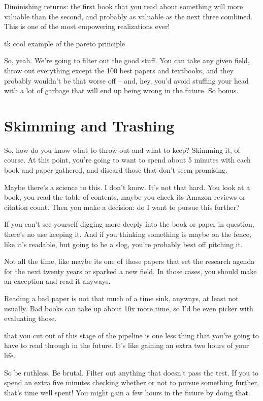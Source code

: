 Diminishing returns: the first book that you read about something will more
valuable than the second, and probably as valuable as the next three
combined. This is one of the most empowering realizations ever!

tk cool example of the pareto principle

So, yeah. We're going to filter out the good stuff. You can take any given
field, throw out everything except the 100 best papers and textbooks, and they
probably wouldn't be that worse off -- and, hey, you'd avoid stuffing your head
with a lot of garbage that will end up being wrong in the future. So bonus.

\section{Skimming and Trashing}

So, how do you know what to throw out and what to keep? Skimming it, of
course. At this point, you're going to want to spend about 5 minutes with each
book and paper gathered, and discard those that don't seem promising.

Maybe there's a science to this. I don't know. It's not that hard. You look at a
book, you read the table of contents, maybe you check its Amazon reviews or
citation count. Then you make a decision: do I want to pursue this further?

If you can't see yourself digging more deeply into the book or paper in
question, there's no use keeping it. And if you thinking something is maybe on
the fence, like it's readable, but going to be a slog, you're probably best off
pitching it.

Not all the time, like maybe its one of those papers that set the research
agenda for the next twenty years or sparked a new field. In those cases, you
should make an exception and read it anyways.

Reading a bad paper is not that much of a time sink, anyways, at least not
usually. Bad books can take up about 10x more time, so I'd be even picker with
evaluating those.

 that you cut out of this stage of the
pipeline is one less thing that you're going to have to read through in the
future. It's like gaining an extra two hours of your life.

So be ruthless. Be brutal. Filter out anything that doesn't pass the test. If
you to spend an extra five minutes checking whether or not to pursue something
further, that's time well spent! You might gain a few hours in the future by
doing that.


